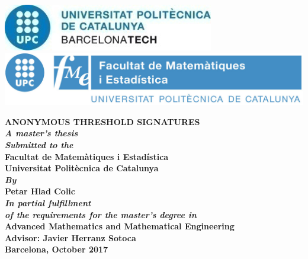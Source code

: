 \documentclass[12pt,a4paper,twoside,openright]{book}
\begin{document}
\newcommand{\titol}{Anonymous threshold signatures}
\newcommand{\shortitol}{Anonymous threshold signatures}
\newcommand{\autor}{Petar Hlad Colic}
\renewcommand{\cleardoublepage}{}

\frontmatter
\begin{titlepage}
   	\includegraphics[scale=1]{images/logoUPC.jpg}
   	\hfill
   	\includegraphics[scale=0.6]{images/logoFME.jpg}\\

   	\begin{center}
   	\vspace{1em}
   	\LARGE\textbf{\MakeUppercase{\titol}} \\
   	\vspace{2em}
   	\large\textit{\textbf{A master's thesis}}\\
   	\large\textit{\textbf{Submitted to the}}\\
   	\vspace{0.5em}
   	\Large\textbf{Facultat de Matem\`atiques i Estad\'istica}\\
   	\vspace{0.5em}
   	\Large\textbf{Universitat Politècnica de Catalunya}\\
   	\vspace{1em}
   	\large\textit{\textbf{By}}\\
   	\LARGE\textbf{\autor}\\
   	\vspace{2em}
   	\large\textit{\textbf{In partial fulfillment}}\\
   	\large\textit{\textbf{of the requirements for the master's degree in}}\\
   	\vspace{0.5em}
   	\Large\textbf{Advanced Mathematics and Mathematical Engineering}\\
   	\vspace{4em}
   	\Large\textbf{Advisor: Javier Herranz Sotoca}\\
   	\vspace{3em}
   	\large\textbf{Barcelona, October 2017}\\
   	\end{center}
\end{titlepage} 
\newpage\null\thispagestyle{empty}\newpage
\newpage{\cleardoublepage}

\newpage{\cleardoublepage}
\end{document}
